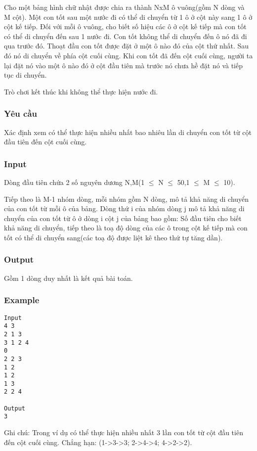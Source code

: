 



   Cho một bảng hình chữ nhật được chia ra thành NxM ô vuông(gồm N dòng và M cột). Một con tốt sau một nước đi có thể di chuyển từ 1 ô ở cột này sang 1 ô ở cột kế tiếp. Đối với mỗi ô vuông, cho biết số hiệu các ô ở cột kế tiếp mà con tốt có thể di chuyển đến sau 1 nước đi. Con tốt không thể di chuyển đến ô nó đã đi qua trước đó. Thoạt đầu con tốt được đặt ở một ô nào đó của cột thứ nhất. Sau đó nó di chuyển về phía cột cuối cùng. Khi con tốt đã đến cột cuối cùng, người ta lại đặt nó vào một ô nào đó ở cột đầu tiên mà trước nó chưa hề đặt nó và tiếp tục di chuyển.  

   Trò chơi kết thúc khi không thể thực hiện nước đi.  

\subsubsection{   Yêu cầu  }

   Xác định xem có thể thực hiện nhiều nhất bao nhiêu lần di chuyển con tốt từ cột đầu tiên đến cột cuối cùng.  

\subsubsection{   Input  }

   Dòng đầu tiên chứa 2 số nguyên dương N,M(1 $\le$ N $\le$ 50,1 $\le$ M $\le$ 10).  

   Tiếp theo là M-1 nhóm dòng, mỗi nhóm gồm N dòng, mô tả khả năng di chuyển của con tốt từ mỗi ô của bảng. Dòng thứ i của nhóm dòng j mô tả khả năng di chuyển của con tốt từ ô ở dòng i cột j của bảng bao gồm: Số đầu tiên cho biết khả năng di chuyển, tiếp theo là toạ độ dòng của các ô trong cột kế tiếp mà con tốt có thể di chuyển sang(các toạ độ được liệt kê theo thứ tự tăng dần).  

\subsubsection{   Output  }

   Gồm 1 dòng duy nhất là kết quả bài toán.  

\subsubsection{   Example  }
\begin{verbatim}
Input
4 3 
2 1 3 
3 1 2 4
0
2 2 3 
1 2 
1 2 
1 3 
2 2 4 

Output
3
\end{verbatim}

   Ghi chú: Trong ví dụ có thể thực hiện nhiều nhất 3 lần con tốt từ cột đầu tiên đến cột cuối cùng. Chẳng hạn: (1->3->3; 2->4->4; 4->2->2).  
